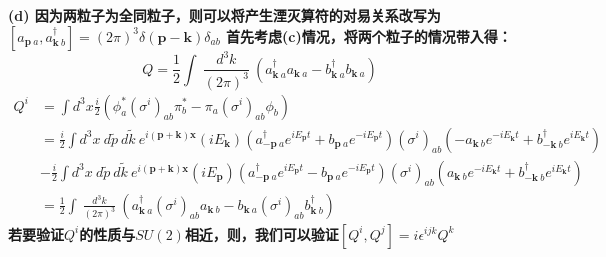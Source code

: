 \documentclass{article}
\begin{document}
\bf{(d)}
因为两粒子为全同粒子，则可以将产生湮灭算符的对易关系改写为
$[a_{\mathbf{p}\:a},a^{\dagger}_{\mathbf{k}\:b}] = (2 \pi)^3 \delta(\mathbf{p}-\mathbf{k}) \delta_{ab}$
首先考虑(c)情况，将两个粒子的情况带入得：
$$
Q=\frac{1}{2} \int \: \frac{d^3 k }{(2 \pi)^3 } \:
	 (a^{\dagger}_{\mathbf{k} \: a} a_{\mathbf{k} \: a} - b^{\dagger}_{\mathbf{k} \: a} b_{\mathbf{k} \: a}  )
$$
\begin{align}
Q^{i}&=\int d^3 x  \frac{i}{2} \left( 
		\phi^{*}_{a} (\sigma^{i})_{ab} \pi^{*}_{b} - \pi_{a} (\sigma^{i})_{ab} \phi_{b} 								\right) \nonumber \\
	&=\frac{i}{2} \int d^3 x \: 
	d \widetilde{p} \: d \widetilde{k} \: e^{i (\mathbf{p}+\mathbf{k}) \mathbf{x}}(i E_{\mathbf{k}})
	\left(
	a^{\dagger}_{-\mathbf{p}\:a} e^{i E_{\mathbf{p}}t} +  b_{\mathbf{p}\:a} e^{-i E_{\mathbf{p}}t} 
	\right) 
		(\sigma^{i})_{ab}
	\left(
	- a_{\mathbf{k} \:b} e^{-i E_{\mathbf{k}}t} +  b^{\dagger}_{-\mathbf{k} \:b} e^{i E_{\mathbf{k}}t} 
	\right) \nonumber \\
	 & -\frac{i}{2} \int d^3 x \: 
	d \widetilde{p} \: d \widetilde{k} \: e^{i (\mathbf{p}+\mathbf{k}) \mathbf{x}}(i E_{\mathbf{p}}) 
	\left(
	a^{\dagger}_{-\mathbf{p} \:a} e^{i E_{\mathbf{p}}t} -  b_{\mathbf{p} \:a} e^{-i E_{\mathbf{p}}t} 
	\right) 
	(\sigma^{i})_{ab}
	\left(
	a_{\mathbf{k} \:b} e^{-i E_{\mathbf{k}}t} +  b^{\dagger}_{-\mathbf{k} \:b} e^{i E_{\mathbf{k}}t} 
	\right)   \nonumber  \\
	&= \frac{1}{2} \int \: \frac{d^3 k }{(2 \pi)^3 } \:
	 (a^{\dagger}_{\mathbf{k} \: a} (\sigma^{i})_{ab} a_{\mathbf{k} \: b } - b_{\mathbf{k} \: a} (\sigma^{i})_{ab} b^{\dagger}_{\mathbf{k} \: b } )  \nonumber 
\end{align}
若要验证$Q^{i}$的性质与$SU(2)$相近，则，我们可以验证$[Q^{i},Q^{j}] = i \epsilon ^{ijk} Q^{k}$
\end{document}
